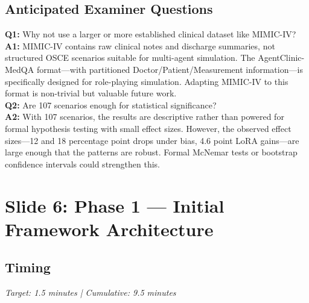 \documentclass[12pt]{article}
\begin{document}
  \subsection*{Anticipated Examiner Questions}
  \begin{qabox}
  \textbf{Q1:} Why not use a larger or more established clinical dataset like MIMIC-IV? \\
  \textbf{A1:} MIMIC-IV contains raw clinical notes and discharge summaries, not structured OSCE scenarios suitable for multi-agent simulation. The AgentClinic-MedQA format---with partitioned Doctor/Patient/Measurement information---is specifically designed for role-playing simulation. Adapting MIMIC-IV to this format is non-trivial but valuable future work. \\[6pt]
  \textbf{Q2:} Are 107 scenarios enough for statistical significance? \\
  \textbf{A2:} With 107 scenarios, the results are descriptive rather than powered for formal hypothesis testing with small effect sizes. However, the observed effect sizes---12 and 18 percentage point drops under bias, 4.6 point LoRA gains---are large enough that the patterns are robust. Formal McNemar tests or bootstrap confidence intervals could strengthen this.
  \end{qabox}



  \section{Slide 6: Phase 1 --- Initial Framework Architecture}

  \subsection*{Timing}
  \textit{Target: 1.5 minutes | Cumulative: 9.5 minutes}
\end{document}
